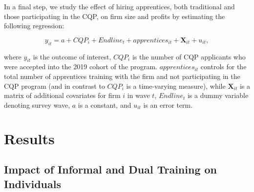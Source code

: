 \documentclass[
  11pt,
a4paper
]{report}
\begin{document}
In a final step, we study the effect of hiring apprentices, both traditional and those participating in the CQP, on firm size and profits by estimating the following regression:

\[ y_{it} =  a+CQP_i+{Endline}_t+apprentices_{it}+\mathbf{X}_{it}+u_{it}, \]

where \(y_{it}\) is the outcome of interest, \(CQP_i\) is the number of CQP applicants who were accepted into the 2019 cohort of the program. \(apprentices_{it}\) controls for the total number of apprentices training with the firm and not participating in the CQP program (and in contrast to \(CQP_i\) is a time-varying measure), while \(\mathbf{X}_{it}\) is a matrix of additional covariates for firm \(i\) in wave \(t\), \({Endline}_t\) is a dummy variable denoting survey wave, \(a\) is a constant, and \(u_{it}\) is an error term.

\FloatBarrier

\hypertarget{cqp_results}{%
\section{Results}\label{cqp_results}}

\hypertarget{appbenefits}{%
\subsection{Impact of Informal and Dual Training on Individuals}\label{appbenefits}}
\end{document}
